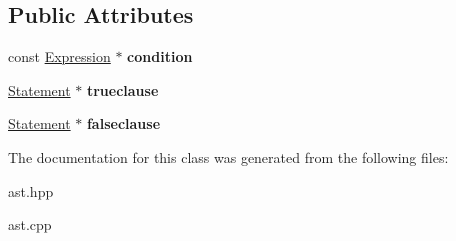 \subsection*{Public Attributes}
\begin{DoxyCompactItemize}
\item 
\mbox{\label{class_if_else_statement_ae31ae98cb2f7bc9b17c9507419c61d50}} 
const \hyperlink{class_expression}{Expression} $\ast$ {\bfseries condition}
\item 
\mbox{\label{class_if_else_statement_aa9a6d5394f839da525496c910f9db3f1}} 
\hyperlink{class_statement}{Statement} $\ast$ {\bfseries trueclause}
\item 
\mbox{\label{class_if_else_statement_ae8181ea8b743060a7e3477e98485f91c}} 
\hyperlink{class_statement}{Statement} $\ast$ {\bfseries falseclause}
\end{DoxyCompactItemize}


The documentation for this class was generated from the following files\+:\begin{DoxyCompactItemize}
\item 
ast.\+hpp\item 
ast.\+cpp\end{DoxyCompactItemize}
